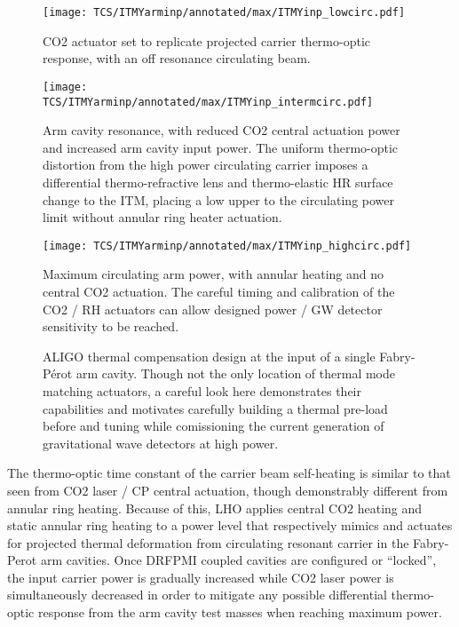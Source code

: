 \begin{figure}[H]
	\begin{subcaptiongroup}
		\centering
		\texttt{[image: TCS/ITMYarminp/annotated/max/ITMYinp\_lowcirc.pdf]}
		\caption{CO2 actuator set to replicate projected carrier thermo-optic response, with an off resonance circulating beam.}\label{subfig:TCSinp_lowcirc}
		\texttt{[image: TCS/ITMYarminp/annotated/max/ITMYinp\_intermcirc.pdf]}
		\caption{Arm cavity resonance, with reduced CO2 central actuation power and increased arm cavity input power. The uniform thermo-optic distortion from the high power circulating carrier imposes a differential thermo-refractive lens and thermo-elastic HR surface change to the ITM, placing a low upper to the circulating power limit without annular ring heater actuation.}\label{subfig:TCSinp_intcirc}
		\texttt{[image: TCS/ITMYarminp/annotated/max/ITMYinp\_highcirc.pdf]}
		\caption{Maximum circulating arm power, with annular heating and no central CO2 actuation. The careful timing and calibration of the CO2 / RH actuators can allow designed power / GW detector sensitivity to be reached.}\label{subfig:TCSinp_highcirc}
	\end{subcaptiongroup}
	\caption{ALIGO thermal compensation design at the input of a single Fabry-P\'{e}rot arm cavity. Though not the only location of thermal mode matching actuators, a careful look here demonstrates their capabilities and motivates carefully building a thermal pre-load before and tuning while comissioning the current generation of gravitational wave detectors at high power.}
	\label{fig:TCSinp}
\end{figure}

The thermo-optic time constant of the carrier beam self-heating is similar to that seen from CO2 laser / CP central actuation, though demonstrably different from annular ring heating. Because of this, LHO applies central CO2 heating and static annular ring heating to a power level that respectively mimics and actuates for projected thermal deformation from circulating resonant carrier in the Fabry-Perot arm cavities. Once DRFPMI coupled cavities are configured or ``locked'', the input carrier power is gradually increased while CO2 laser power is simultaneously decreased in order to mitigate any possible differential thermo-optic response from the arm cavity test masses when reaching maximum power.

